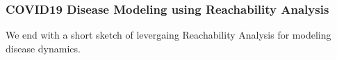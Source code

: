 \subsubsection{COVID19 Disease Modeling using Reachability Analysis}
\label{sec:covid_blog}

We end with a short sketch of levergaing Reachability Analysis for modeling disease dynamics.
